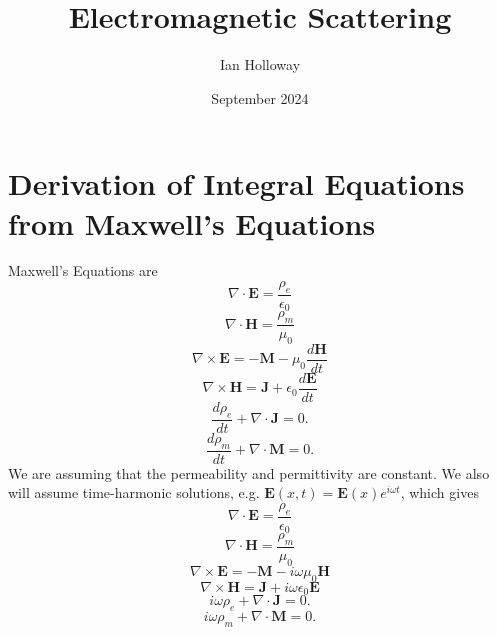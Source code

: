 \documentclass{article}
\title{Electromagnetic Scattering}
\author{Ian Holloway}
\date{September 2024}
\newcommand{\Div}[0]{\nabla\cdot}
\newcommand{\Curl}[0]{\nabla\times}
\theoremstyle{plain}
\begin{document}
\maketitle


\section{Derivation of Integral Equations from Maxwell's Equations}

Maxwell's Equations are
\begin{equation}
	\Div\mathbf{E} = \frac{\rho_e}{\epsilon_0}
\end{equation}
\begin{equation}
	\Div\mathbf{H} = \frac{\rho_m}{\mu_0}
\end{equation}
\begin{equation}
	\Curl\mathbf{E} = -\mathbf{M} -\mu_0\frac{d\mathbf{H}}{dt}
\end{equation}
\begin{equation}
	\Curl\mathbf{H} = \mathbf{J} + \epsilon_0\frac{d\mathbf{E}}{dt}
\end{equation}
\begin{equation}
	\frac{d\rho_e}{dt} + \Div\mathbf{J} = 0.
\end{equation}
\begin{equation}
	\frac{d\rho_m}{dt} + \Div\mathbf{M} = 0.
\end{equation}
We are assuming that the permeability and permittivity are constant.
We also will assume time-harmonic solutions, e.g. $\mathbf{E}(x,t)=\mathbf{E}(x)e^{i\omega t}$, which gives
\begin{equation}
	\Div\mathbf{E} = \frac{\rho_e}{\epsilon_0}
\end{equation}
\begin{equation}
	\Div\mathbf{H} = \frac{\rho_m}{\mu_0}
\end{equation}
\begin{equation}
	\Curl\mathbf{E} = -\mathbf{M} -i\omega\mu_0\mathbf{H}
\end{equation}
\begin{equation}
	\Curl\mathbf{H} = \mathbf{J} + i\omega\epsilon_0\mathbf{E}
\end{equation}
\begin{equation}
	i\omega\rho_e + \Div\mathbf{J} = 0.
\end{equation}
\begin{equation}
	i\omega\rho_m + \Div\mathbf{M} = 0.
\end{equation}
\end{document}
